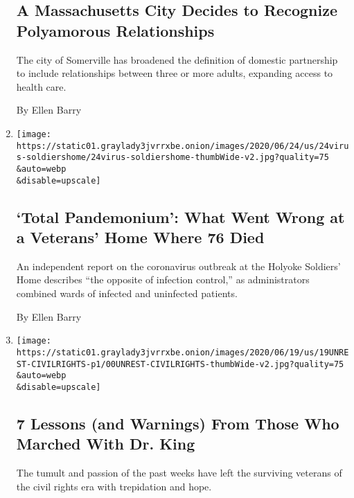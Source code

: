 \begin{enumerate}
{  \subsection{A Massachusetts City Decides to Recognize Polyamorous
  Relationships}\label{a-massachusetts-city-decides-to-recognize-polyamorous-relationships}}

  The city of Somerville has broadened the definition of domestic
  partnership to include relationships between three or more adults,
  expanding access to health care.

  By Ellen Barry
\item
  \href{/2020/06/24/us/holyoke-soldiers-home.html}{}

  \texttt{[image: https://static01.graylady3jvrrxbe.onion/images/2020/06/24/us/24virus-soldiershome/24virus-soldiershome-thumbWide-v2.jpg?quality=75\\\&auto=webp\\\&disable=upscale]}

  \hypertarget{total-pandemonium-what-went-wrong-at-a-veterans-home-where-76-died}{%
  \subsection{`Total Pandemonium': What Went Wrong at a Veterans' Home
  Where 76
  Died}\label{total-pandemonium-what-went-wrong-at-a-veterans-home-where-76-died}}

  An independent report on the coronavirus outbreak at the Holyoke
  Soldiers' Home describes ``the opposite of infection control,'' as
  administrators combined wards of infected and uninfected patients.

  By Ellen Barry
\item
  \href{/2020/06/17/us/george-floyd-protests.html}{}

  \texttt{[image: https://static01.graylady3jvrrxbe.onion/images/2020/06/19/us/19UNREST-CIVILRIGHTS-p1/00UNREST-CIVILRIGHTS-thumbWide-v2.jpg?quality=75\\\&auto=webp\\\&disable=upscale]}

  \hypertarget{7-lessons-and-warnings-from-those-who-marched-with-dr-king}{%
  \subsection{7 Lessons (and Warnings) From Those Who Marched With Dr.
  King}\label{7-lessons-and-warnings-from-those-who-marched-with-dr-king}}

  The tumult and passion of the past weeks have left the surviving
  veterans of the civil rights era with trepidation and hope.


\end{enumerate}
